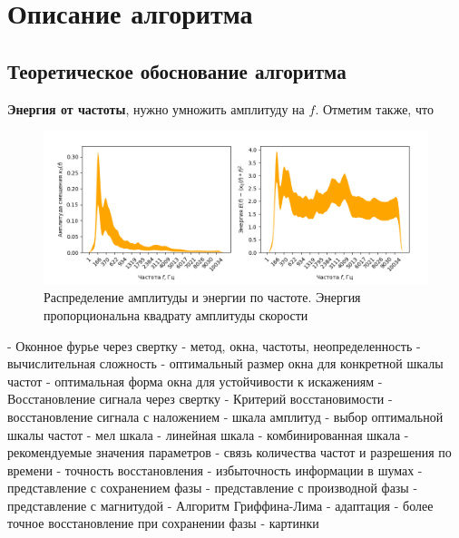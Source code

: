 \chapter{Описание алгоритма}
\label{cha:ch_2}

\section{Теоретическое обоснование алгоритма}

\textbf{Энергия от частоты}, нужно умножить амплитуду на $f$.
Отметим также, что \textbf{}

\begin{figure}
  \centering
  \includegraphics[width=0.9\linewidth]{figures/spectrum_mean}
  \caption{Распределение амплитуды и энергии по частоте. Энергия пропорциональна квадрату амплитуды скорости}
  \label{fig:spectrum_mean}
\end{figure}

\begin{markdown}
 - Оконное фурье через свертку
   - метод, окна, частоты, неопределенность
   - вычислительная сложность
 - оптимальный размер окна для конкретной шкалы частот
 - оптимальная форма окна для устойчивости к искажениям
 - Восстановление сигнала через свертку
 - Критерий восстановимости
 - восстановление сигнала с наложением
 - шкала амплитуд
 - выбор оптимальной шкалы частот
   - мел шкала
   - линейная шкала
   - комбинированная шкала
 - рекомендуемые значения параметров
 - связь количества частот и разрешения по времени
 - точность восстановления
 - избыточность информации в шумах
 - представление с сохранением фазы
 - представление с производной фазы
 - представление с магнитудой
 - Алгоритм Гриффина-Лима
  - адаптация
  - более точное восстановление при сохранении фазы
 - картинки
\end{markdown}

